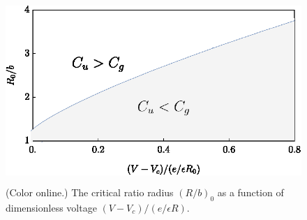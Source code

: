 \documentclass[10pt]{article}
\begin{document}
\begin{figure}[H]
	\centering
	\includegraphics[height=7cm]{ratio_radius.eps}
	\caption{(Color online.) The critical ratio radius $(R/b)_0$ as a function of dimensionless voltage $(V-V_c)/(e/\epsilon R)$.}
	\label{fig: 5}
\end{figure}
\end{document}
